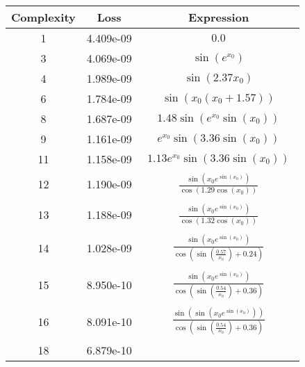 \begin{center}
        \begin{tabular}{|c|c|c|}
        \hline
        Complexity & Loss & Expression \\
        \hline
        1 & 4.409e-09 & $\begin{aligned}0.0\end{aligned}$\\ \hline3 & 4.069e-09 & $\begin{aligned}\sin{\left(e^{x_{0}} \right)}\end{aligned}$\\ \hline4 & 1.989e-09 & $\begin{aligned}\sin{\left(2.37 x_{0} \right)}\end{aligned}$\\ \hline6 & 1.784e-09 & $\begin{aligned}\sin{\left(x_{0} \left(x_{0} + 1.57\right) \right)}\end{aligned}$\\ \hline8 & 1.687e-09 & $\begin{aligned}1.48 \sin{\left(e^{x_{0}} \sin{\left(x_{0} \right)} \right)}\end{aligned}$\\ \hline9 & 1.161e-09 & $\begin{aligned}e^{x_{0}} \sin{\left(3.36 \sin{\left(x_{0} \right)} \right)}\end{aligned}$\\ \hline11 & 1.158e-09 & $\begin{aligned}1.13 e^{x_{0}} \sin{\left(3.36 \sin{\left(x_{0} \right)} \right)}\end{aligned}$\\ \hline12 & 1.190e-09 & $\begin{aligned}\frac{\sin{\left(x_{0} e^{\sin{\left(x_{0} \right)}} \right)}}{\cos{\left(1.29 \cos{\left(x_{0} \right)} \right)}}\end{aligned}$\\ \hline13 & 1.188e-09 & $\begin{aligned}\frac{\sin{\left(x_{0} e^{\sin{\left(x_{0} \right)}} \right)}}{\cos{\left(1.32 \cos{\left(x_{0} \right)} \right)}}\end{aligned}$\\ \hline14 & 1.028e-09 & $\begin{aligned}\frac{\sin{\left(x_{0} e^{\sin{\left(x_{0} \right)}} \right)}}{\cos{\left(\sin{\left(\frac{0.57}{x_{0}} \right)} + 0.24 \right)}}\end{aligned}$\\ \hline15 & 8.950e-10 & $\begin{aligned}\frac{\sin{\left(x_{0} e^{\sin{\left(x_{0} \right)}} \right)}}{\cos{\left(\sin{\left(\frac{0.54}{x_{0}} \right)} + 0.36 \right)}}\end{aligned}$\\ \hline16 & 8.091e-10 & $\begin{aligned}\frac{\sin{\left(\sin{\left(x_{0} e^{\sin{\left(x_{0} \right)}} \right)} \right)}}{\cos{\left(\sin{\left(\frac{0.54}{x_{0}} \right)} + 0.36 \right)}}\end{aligned}$\\ \hline18 & 6.879e-10 
\end{tabular}
\end{center}
